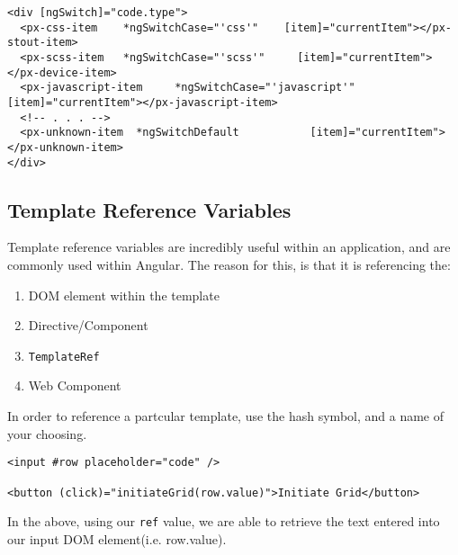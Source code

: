 \begin{lstlisting}
<div [ngSwitch]="code.type">
  <px-css-item    *ngSwitchCase="'css'"    [item]="currentItem"></px-stout-item>
  <px-scss-item   *ngSwitchCase="'scss'"     [item]="currentItem"></px-device-item>
  <px-javascript-item     *ngSwitchCase="'javascript'"  [item]="currentItem"></px-javascript-item>
  <!-- . . . -->
  <px-unknown-item  *ngSwitchDefault           [item]="currentItem"></px-unknown-item>
</div>
\end{lstlisting}

\subsection{ Template Reference Variables }
Template reference variables are incredibly useful within an application, and 
are commonly used within Angular. The reason for this, is that it is 
referencing the:
\begin{enumerate}
  \item DOM element within the template
  \item Directive/Component
  \item \lstinline{TemplateRef}
  \item Web Component
\end{enumerate}

In order to reference a partcular template, use the hash symbol, and a name of 
your choosing. 

\begin{lstlisting}
<input #row placeholder="code" />  

<button (click)="initiateGrid(row.value)">Initiate Grid</button>
\end{lstlisting}

In the above, using our \lstinline{ref} value, we are able to retrieve the 
text entered into our input DOM element(i.e. row.value). 